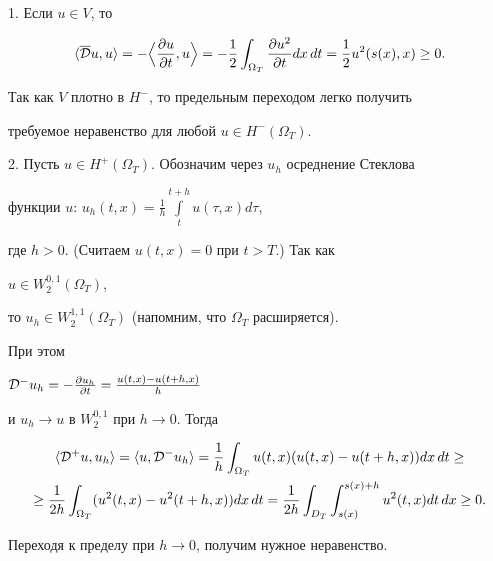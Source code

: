\begin{pf} 


1. Если $u\in V$, то 


$$


\la \overline{\cal D}u,u\ra=


-\Big\la\frac{\partial u}{\partial t}, u\Big\ra=


-\frac{1}{2}\int_{\Omega_T} \frac{\partial u^2}{\partial t}dx\,dt=


\frac{1}{2}u^2(s(x),x)\geq 0.


$$


Так как $V$ плотно в $H^-$, то предельным переходом легко получить 


требуемое неравенство для любой $u\in H^-(\Omega_T)$.


 


2. Пусть $u\in H^+(\Omega_T)$. Обозначим через $u_h$ осреднение Стеклова


функции $u$: $u_h(t,x)=\frac{1}{h}\int\limits_{t}^{t+h} u(\tau,x)d\tau$,


где $h>0$. (Считаем $u(t,x)=0$ при $t>T$.) Так как


$u \in W_2^{0,1}(\Omega_T)$,


то $u_h\in W_2^{1,1}(\Omega_T)$ (напомним, что $\Omega_T$ расширяется).


При этом


${\cal D}^- u_h=-\frac{\partial u_h}{\partial t}=\frac{u(t,x)-u(t+h,x)}{h}$ 


и $u_h \to u$ в $W_2^{0,1}$ при $h \to 0$. Тогда


\begin{multline*}


\la {\cal D}^+ u, u_h\ra =


\la u, {\cal D}^-{u_h} \ra


=\frac{1}{h} \int_{\Omega_T} u(t,x) ( u(t,x) -u(t+h,x) )dx\,dt \geq \\


%


\geq \frac{1}{2h} \int_{\Omega_T} ( u^2(t,x)-u^2(t+h,x) ) dx\,dt=


\frac{1}{2h} \int_{D_T} \int_{s(x)}^{s(x)+h} u^2(t,x) dt\,dx \geq 0.


\end{multline*}


Переходя к пределу при $h \to 0$, получим нужное неравенство.


\end{pf}






